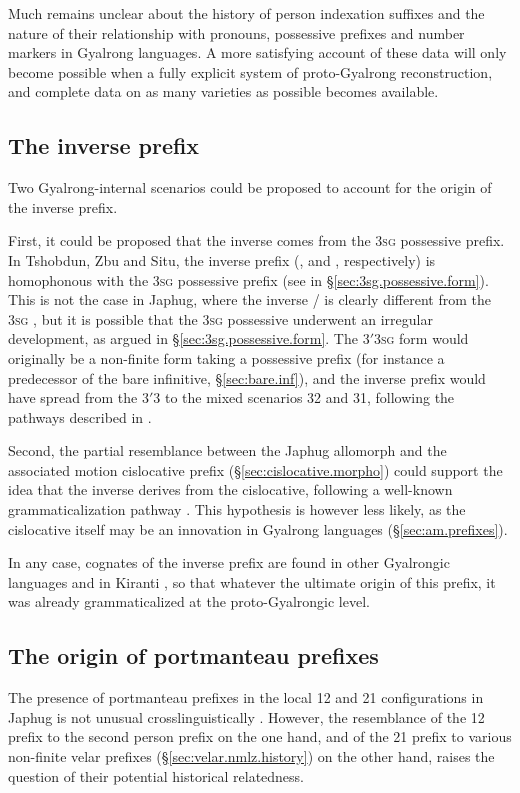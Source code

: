 Much remains unclear about the history of person indexation suffixes and the nature of their relationship with pronouns, possessive prefixes and number markers in Gyalrong languages. A more satisfying account of these data will only become possible when a fully explicit system of proto-Gyalrong reconstruction, and complete data on as many varieties as possible becomes available.

\subsection{The inverse prefix} \label{sec:inverse.history}
Two Gyalrong-internal scenarios could be proposed to account for the origin of the inverse prefix. 

First, it could be proposed that the inverse comes from the \textsc{3sg} possessive prefix. In Tshobdun, Zbu and Situ, the inverse prefix (,  and , respectively) is homophonous with the \textsc{3sg} possessive prefix (see  in §\ref{sec:3sg.possessive.form}). This is not the case in Japhug, where the inverse  /  is clearly different from the \textsc{3sg} , but it is possible that the \textsc{3sg} possessive underwent an irregular development, as argued in §\ref{sec:3sg.possessive.form}. The 3$'$\fl{}3\textsc{sg} form would originally be a non-finite form taking a possessive prefix (for instance a predecessor of the bare infinitive, §\ref{sec:bare.inf}), and the inverse prefix would have spread from the 3$'$\fl{}3 to the mixed scenarios 3\fl{}2 and 3\fl{}1, following the pathways described in \citealt{jacques18directionality}.

Second, the partial resemblance between the Japhug allomorph  and the associated motion cislocative  prefix (§\ref{sec:cislocative.morpho}) could support the idea that the inverse derives from the cislocative, following a well-known grammaticalization pathway \citep{jacques14inverse}. This hypothesis is however less likely, as the cislocative itself may be an innovation in Gyalrong languages (§\ref{sec:am.prefixes}).
 
In any case, cognates of the inverse prefix are found in other Gyalrongic languages \citep{lai15person} and in Kiranti \citep{jacques12agreement}, so that whatever the ultimate origin of this prefix, it was already grammaticalized at the proto-Gyalrongic level.

\subsection{The origin of portmanteau prefixes} \label{sec:portmanteau.prefixes.history}
The presence of portmanteau prefixes in the local 1\fl{}2 and 2\fl{}1 configurations in Japhug is not unusual crosslinguistically \citep{heath98skewing}. However, the resemblance of the 1\fl{}2 prefix  to the second person  prefix on the one hand, and of the 2\fl{}1 prefix  to various non-finite velar prefixes (§\ref{sec:velar.nmlz.history}) on the other hand, raises the question of their potential historical relatedness. 

